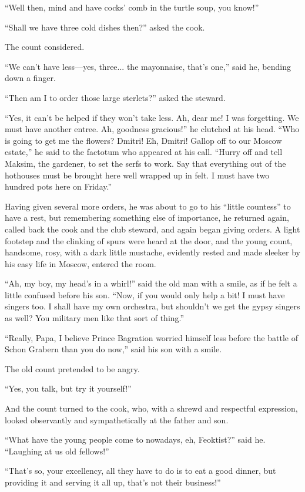 ``Well then, mind and have cocks' comb in the turtle soup, you
know!''

``Shall we have three cold dishes then?'' asked the cook.

The count considered.

``We can't have less---yes, three... the mayonnaise, that's
one,'' said he, bending down a finger.

``Then am I to order those large sterlets?'' asked the steward.

``Yes, it can't be helped if they won't take less. Ah, dear me! I
was forgetting. We must have another entree. Ah, goodness
gracious!'' he clutched at his head. ``Who is going to get me the
flowers? Dmitri! Eh, Dmitri! Gallop off to our Moscow estate,''
he said to the factotum who appeared at his call. ``Hurry off and
tell Maksim, the gardener, to set the serfs to work. Say that
everything out of the hothouses must be brought here well wrapped
up in felt. I must have two hundred pots here on Friday.''

Having given several more orders, he was about to go to his
``little countess'' to have a rest, but remembering something
else of importance, he returned again, called back the cook and
the club steward, and again began giving orders. A light footstep
and the clinking of spurs were heard at the door, and the young
count, handsome, rosy, with a dark little mustache, evidently
rested and made sleeker by his easy life in Moscow, entered the
room.

``Ah, my boy, my head's in a whirl!'' said the old man with a
smile, as if he felt a little confused before his son. ``Now, if
you would only help a bit! I must have singers too. I shall have
my own orchestra, but shouldn't we get the gypsy singers as well?
You military men like that sort of thing.''

``Really, Papa, I believe Prince Bagration worried himself less
before the battle of Schon Grabern than you do now,'' said his
son with a smile.

The old count pretended to be angry.

``Yes, you talk, but try it yourself!''

And the count turned to the cook, who, with a shrewd and
respectful expression, looked observantly and sympathetically at
the father and son.

``What have the young people come to nowadays, eh, Feoktist?''
said he.  ``Laughing at us old fellows!''

``That's so, your excellency, all they have to do is to eat a
good dinner, but providing it and serving it all up, that's not
their business!''

